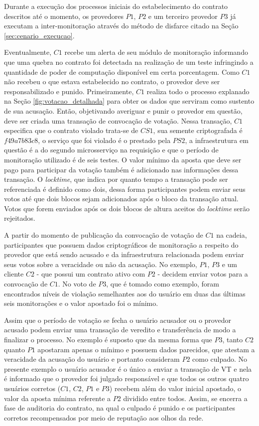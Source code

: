 %
Durante a execução dos processos iniciais do estabelecimento do contrato descritos até o momento, os provedores $P1$, $P2$ e um terceiro provedor $P3$ já executam a inter-monitoração através do método de disfarce citado na Seção \ref{sec:cenario_execucao}.

%
Eventualmente, $C1$ recebe um alerta de seu módulo de monitoração informando que uma quebra no contrato foi detectada na realização de um teste infringindo a quantidade de poder de computação disponível em certa porcentagem. Como $C1$ não recebeu o que estava estabelecido no contrato, o provedor deve ser responsabilizado e punido. Primeiramente, $C1$ realiza todo o processo explanado na Seção \ref{fig:votacao_detalhada} para obter os dados que serviram como sustento de sua acusação. Então, objetivando averiguar e punir o provedor em questão, deve ser criada uma transação de convocação de votação. Nessa transação, $C1$ especifica que o contrato violado trata-se de $CS1$, sua semente criptografada é $f49a7b83c8$,  o serviço que foi violado é o prestado pela $PS2$, a infraestrutura em questão é a do segundo microsserviço na requisição e que o período de monitoração utilizado é de seis testes. O valor mínimo da aposta que deve ser pago para participar da votação também é adicionado nas informações dessa transação. O \textit{locktime}, que indica por quanto tempo a transação pode ser referenciada é definido como dois, dessa forma participantes podem enviar seus votos até que dois blocos sejam adicionados após o bloco da transação atual. Votos que forem enviados após os dois blocos de altura aceitos do \textit{locktime} serão rejeitados.

%
A partir do momento de publicação da convocação de votação de $C1$ na cadeia, participantes que possuem dados criptográficos de monitoração a respeito do provedor que está sendo acusado e da infraestrutura relacionada podem enviar seus votos sobre a veracidade ou não da acusação. No exemplo, $P1$, $P3$ e um cliente $C2$ - que possui um contrato ativo com $P2$ - decidem enviar votos para a convocação de $C1$. No voto de $P3$, que é tomado como exemplo, foram encontrados níveis de violação semelhantes aos do usuário em duas das últimas seis monitorações e o valor apostado foi o mínimo.

%
Assim que o período de votação se fecha o usuário acusador ou o provedor acusado podem enviar uma transação de veredito e transferência de modo a finalizar o processo. No exemplo é suposto que da mesma forma que $P3$, tanto $C2$ quanto $P1$ apostaram apenas o mínimo e possuem dados parecidos, que atestam a veracidade da acusação do usuário e portanto consideram $P2$ como culpado. No presente exemplo o usuário acusador é o único a enviar a transação de \ac{VT} e nela é informado que o provedor foi julgado responsável e que todos os outros quatro usuários corretos ($C1$, $C2$, $P1$ e $P3$) recebem além do valor inicial apostado, o valor da aposta mínima referente a $P2$ dividido entre todos. Assim, se encerra a fase de auditoria do contrato, na qual o culpado é punido e os participantes corretos recompensados por meio de reputação aos olhos da rede.

